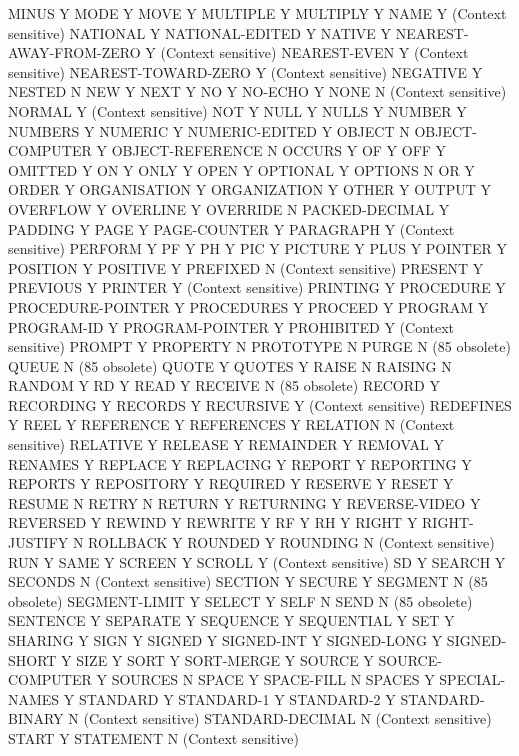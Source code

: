 MINUS				Y
MODE				Y
MOVE				Y
MULTIPLE			Y
MULTIPLY			Y
NAME				Y (Context sensitive)
NATIONAL			Y
NATIONAL-EDITED			Y
NATIVE				Y
NEAREST-AWAY-FROM-ZERO		Y (Context sensitive)
NEAREST-EVEN			Y (Context sensitive)
NEAREST-TOWARD-ZERO		Y (Context sensitive)
NEGATIVE			Y
NESTED				N
NEW				Y
NEXT				Y
NO				Y
NO-ECHO				Y
NONE				N (Context sensitive)
NORMAL				Y (Context sensitive)
NOT				Y
NULL				Y
NULLS				Y
NUMBER				Y
NUMBERS				Y
NUMERIC				Y
NUMERIC-EDITED			Y
OBJECT				N
OBJECT-COMPUTER			Y
OBJECT-REFERENCE		N
OCCURS				Y
OF				Y
OFF				Y
OMITTED				Y
ON				Y
ONLY				Y
OPEN				Y
OPTIONAL			Y
OPTIONS				N
OR				Y
ORDER				Y
ORGANISATION			Y
ORGANIZATION			Y
OTHER				Y
OUTPUT				Y
OVERFLOW			Y
OVERLINE			Y
OVERRIDE			N
PACKED-DECIMAL			Y
PADDING				Y
PAGE				Y
PAGE-COUNTER			Y
PARAGRAPH			Y (Context sensitive)
PERFORM				Y
PF				Y
PH				Y
PIC				Y
PICTURE				Y
PLUS				Y
POINTER				Y
POSITION			Y
POSITIVE			Y
PREFIXED			N (Context sensitive)
PRESENT				Y
PREVIOUS			Y
PRINTER				Y (Context sensitive)
PRINTING			Y
PROCEDURE			Y
PROCEDURE-POINTER		Y
PROCEDURES			Y
PROCEED				Y
PROGRAM				Y
PROGRAM-ID			Y
PROGRAM-POINTER			Y
PROHIBITED			Y (Context sensitive)
PROMPT				Y
PROPERTY			N
PROTOTYPE			N
PURGE				N (85 obsolete)
QUEUE				N (85 obsolete)
QUOTE				Y
QUOTES				Y
RAISE				N
RAISING				N
RANDOM				Y
RD				Y
READ				Y
RECEIVE				N (85 obsolete)
RECORD				Y
RECORDING			Y
RECORDS				Y
RECURSIVE			Y (Context sensitive)
REDEFINES			Y
REEL				Y
REFERENCE			Y
REFERENCES			Y
RELATION			N (Context sensitive)
RELATIVE			Y
RELEASE				Y
REMAINDER			Y
REMOVAL				Y
RENAMES				Y
REPLACE				Y
REPLACING			Y
REPORT				Y
REPORTING			Y
REPORTS				Y
REPOSITORY			Y
REQUIRED			Y
RESERVE				Y
RESET				Y
RESUME				N
RETRY				N
RETURN				Y
RETURNING			Y
REVERSE-VIDEO			Y
REVERSED			Y
REWIND				Y
REWRITE				Y
RF				Y
RH				Y
RIGHT				Y
RIGHT-JUSTIFY			N
ROLLBACK			Y
ROUNDED				Y
ROUNDING			N (Context sensitive)
RUN				Y
SAME				Y
SCREEN				Y
SCROLL				Y (Context sensitive)
SD				Y
SEARCH				Y
SECONDS				N (Context sensitive)
SECTION				Y
SECURE				Y
SEGMENT				N (85 obsolete)
SEGMENT-LIMIT			Y
SELECT				Y
SELF				N
SEND				N (85 obsolete)
SENTENCE			Y
SEPARATE			Y
SEQUENCE			Y
SEQUENTIAL			Y
SET				Y
SHARING				Y
SIGN				Y
SIGNED				Y
SIGNED-INT			Y
SIGNED-LONG			Y
SIGNED-SHORT			Y
SIZE				Y
SORT				Y
SORT-MERGE			Y
SOURCE				Y
SOURCE-COMPUTER			Y
SOURCES				N
SPACE				Y
SPACE-FILL			N
SPACES				Y
SPECIAL-NAMES			Y
STANDARD			Y
STANDARD-1			Y
STANDARD-2			Y
STANDARD-BINARY			N (Context sensitive)
STANDARD-DECIMAL		N (Context sensitive)
START				Y
STATEMENT			N (Context sensitive)
